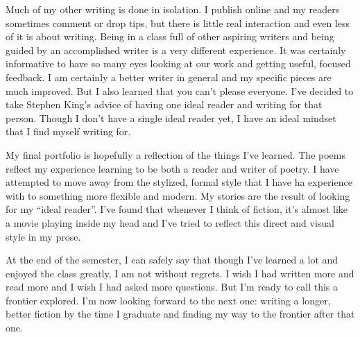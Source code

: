 \documentclass[12pt,letterpaper]{article}
\begin{document}
Much of my other writing is done in isolation. I publish online and my readers sometimes comment or drop tips, but there is little real interaction and even less of it is about writing. Being in a class full of other aspiring writers and being guided by an accomplished writer is a very different experience. It was certainly informative to have so many eyes looking at our work and getting useful, focused feedback. I am certainly a better writer in general and my specific pieces are much improved. But I also learned that you can't please everyone. I've decided to take Stephen King's advice of having one ideal reader and writing for that person. Though I don't have a single ideal reader yet, I have an ideal mindset that I find myself writing for.

My final portfolio is hopefully a reflection of the things I've learned. The poems reflect my experience learning to be both a reader and writer of poetry. I have attempted to move away from the stylized, formal style that I have ha experience with to something more flexible and modern. My stories are the result of looking for my ``ideal reader''. I've found that whenever I think of fiction, it's almost like a movie playing inside my head and I've tried to reflect this direct and visual style in my prose.

At the end of the semester, I can safely say that though I've learned a lot and enjoyed the class greatly, I am not without regrets. I wish I had written more and read more and I wish I had asked more questions. But I'm ready to call this a frontier explored. I'm now looking forward to the next one: writing a longer, better fiction by the time I graduate and finding my way to the frontier after that one.

\end{document}
